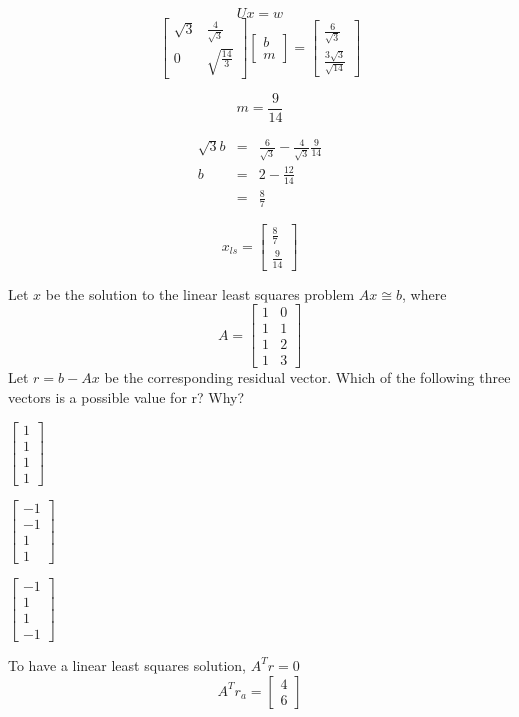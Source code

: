 \documentclass{jhwhw}
\begin{document}
\[
Ux = w
\]
\[
\begin{bmatrix}
  \sqrt{3}           & \frac{4}{\sqrt{3}} \\[6pt]
   0 & \sqrt{\frac{14}{3}}
\end{bmatrix}
\begin{bmatrix}
  b \\
  m
\end{bmatrix}
=
\begin{bmatrix}
  \frac{6}{\sqrt{3}} \\[6pt]
  \frac{3\sqrt{3}}{\sqrt{14}}
\end{bmatrix}
\]

\[
  m =  \frac{9}{14}
\]

\begin{eqnarray*}
  \sqrt{3}b &=& \frac{6}{\sqrt{3}} - \frac{4}{\sqrt{3}}\frac{9}{14} \\
  b &=& 2 - \frac{12}{14} \\ 
  &=& \frac{8}{7} 
\end{eqnarray*}

\[
x_{ls} = 
\begin{bmatrix}
  \frac{8}{7} \\[6pt]
  \frac{9}{14}
\end{bmatrix}
\]

Let $x$ be the solution to the linear least squares problem \(Ax\cong b\), where
\[
A =
\begin{bmatrix}
  1 & 0 \\
  1 & 1 \\
  1 & 2 \\
  1 & 3
\end{bmatrix}
\]
Let \(r = b - Ax\) be the corresponding residual vector. Which of the following 
three vectors is a possible value for r? Why?
\begin{center}
\begin{inparaenum}
\item 
  \(
  \begin{bmatrix}
	1 \\
	1 \\
	1 \\
	1
  \end{bmatrix}
  \)
\item 
  \(
  \begin{bmatrix}
	-1 \\
	-1 \\
	 1 \\
	 1
  \end{bmatrix}
  \)
\item
\(
  \begin{bmatrix}
	-1 \\
	 1 \\
	 1 \\
	-1
  \end{bmatrix}
  \)
\end{inparaenum}
\end{center}
\solution
To have a linear least squares solution, \(A^Tr = 0\)
\[
A^Tr_a = 
\begin{bmatrix}
  4 \\
  6
\end{bmatrix}
\]
\end{document}
